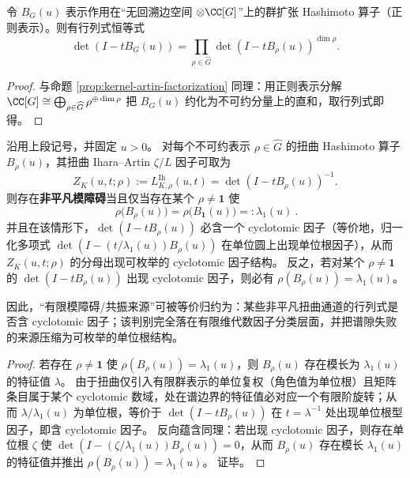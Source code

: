 \begin{proposition}\label{prop:ihara-artin-factorization}
令 \(B_{G}(u)\) 表示作用在“无回溯边空间 \(\otimes\CC[G]\)”上的群扩张 Hashimoto 算子（正则表示）。则有行列式恒等式
\[
\det(I-tB_{G}(u))=\prod_{\rho\in\widehat G}\det(I-tB_{\rho}(u))^{\dim\rho}.
\]
\end{proposition}

\begin{proof}
与命题 \ref{prop:kernel-artin-factorization} 同理：用正则表示分解
\(
\CC[G]\cong\bigoplus_{\rho\in\widehat G}\rho^{\oplus \dim\rho}
\)
把 \(B_G(u)\) 约化为不可约分量上的直和，取行列式即得。
\end{proof}

\begin{theorem}\label{thm:conclusion75-ihara-cyclotomic-factor-classification}
沿用上段记号，并固定 \(u>0\)。
对每个不可约表示 \(\rho\in\widehat G\) 的扭曲 Hashimoto 算子 \(B_\rho(u)\)，其扭曲 Ihara--Artin \(\zeta/L\) 因子可取为
\[
Z_{K}(u,t;\rho):=L^{\mathrm{Ih}}_{K,\rho}(u,t)=\det(I-tB_\rho(u))^{-1}.
\]
则存在\textbf{非平凡模障碍}当且仅当存在某个 \(\rho\neq\mathbf 1\) 使
\[
\boxed{\ \rho\!\bigl(B_\rho(u)\bigr)=\rho\!\bigl(B_{\mathbf 1}(u)\bigr)=:\lambda_1(u)\ }.
\]
并且在该情形下，\(\det(I-tB_\rho(u))\) 必含一个 cyclotomic 因子（等价地，归一化多项式 \(\det(I-(t/\lambda_1(u))B_\rho(u))\) 在单位圆上出现单位根因子），从而 \(Z_K(u,t;\rho)\) 的分母出现可枚举的 cyclotomic 因子结构。
反之，若对某个 \(\rho\neq\mathbf 1\) 的 \(\det(I-tB_\rho(u))\) 出现 cyclotomic 因子，则必有 \(\rho(B_\rho(u))=\lambda_1(u)\)。
\par
因此，“有限模障碍/共振来源”可被等价归约为：某些非平凡扭曲通道的行列式是否含 cyclotomic 因子；该判别完全落在有限维代数因子分类层面，并把谱隙失败的来源压缩为可枚举的单位根结构。
\end{theorem}

\begin{proof}
若存在 \(\rho\neq\mathbf 1\) 使 \(\rho(B_\rho(u))=\lambda_1(u)\)，则 \(B_\rho(u)\) 存在模长为 \(\lambda_1(u)\) 的特征值 \(\lambda\)。
由于扭曲仅引入有限群表示的单位复权（角色值为单位根）且矩阵条目属于某个 cyclotomic 数域，处在谱边界的特征值必对应一个有限阶旋转；从而 \(\lambda/\lambda_1(u)\) 为单位根，等价于 \(\det(I-tB_\rho(u))\) 在 \(t=\lambda^{-1}\) 处出现单位根型因子，即含 cyclotomic 因子。
反向蕴含同理：若出现 cyclotomic 因子，则存在单位根 \(\zeta\) 使 \(\det(I-(\zeta/\lambda_1(u))B_\rho(u))=0\)，从而 \(B_\rho(u)\) 存在模长 \(\lambda_1(u)\) 的特征值并推出 \(\rho(B_\rho(u))=\lambda_1(u)\)。
证毕。
\end{proof}

